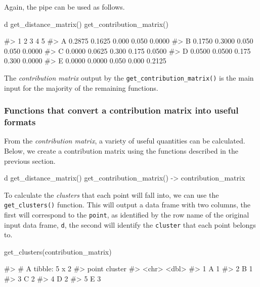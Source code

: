 Again, the  pipe can be used as follows.

\begin{Schunk}
\begin{Sinput}
d %
  get_distance_matrix() %
  get_contribution_matrix()
\end{Sinput}
\begin{Soutput}
#>        1      2     3     4      5
#> A 0.2875 0.1625 0.000 0.050 0.0000
#> B 0.1750 0.3000 0.050 0.050 0.0000
#> C 0.0000 0.0625 0.300 0.175 0.0500
#> D 0.0500 0.0500 0.175 0.300 0.0000
#> E 0.0000 0.0000 0.050 0.000 0.2125
\end{Soutput}
\end{Schunk}

The \emph{contribution matrix} output by the
\texttt{get\_contribution\_matrix()} is the main input for the majority
of the remaining functions.

\hypertarget{functions-that-convert-a-contribution-matrix-into-useful-formats}{%
\subsubsection{Functions that convert a contribution matrix into useful
formats}\label{functions-that-convert-a-contribution-matrix-into-useful-formats}}

From the \emph{contribution matrix}, a variety of useful quantities can
be calculated. Below, we create a contribution matrix using the
functions described in the previous section.

\begin{Schunk}
\begin{Sinput}
d %
  get_distance_matrix() %
  get_contribution_matrix() -> contribution_matrix
\end{Sinput}
\end{Schunk}

To calculate the \emph{clusters} that each point will fall into, we can
use the \texttt{get\_clusters()} function. This will output a data frame
with two columns, the first will correspond to the \texttt{point}, as
identified by the row name of the original input data frame, \texttt{d},
the second will identify the \texttt{cluster} that each point belongs
to.

\begin{Schunk}
\begin{Sinput}
get_clusters(contribution_matrix)
\end{Sinput}
\begin{Soutput}
#> # A tibble: 5 x 2
#>   point cluster
#>   <chr>   <dbl>
#> 1 A           1
#> 2 B           1
#> 3 C           2
#> 4 D           2
#> 5 E           3
\end{Soutput}
\end{Schunk}

